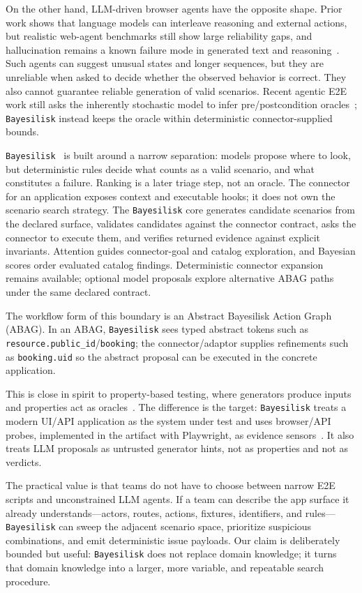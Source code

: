 \documentclass[10pt]{article}
\newcommand{\tool}{\texttt{Bayesilisk}\xspace}
\begin{document}
On the other hand, LLM-driven browser agents have the opposite shape. Prior work
shows that language models can interleave reasoning and external actions, but
realistic web-agent benchmarks still show large reliability gaps, and
hallucination remains a known failure mode in generated text and
reasoning~\cite{react,webarena,ji2023hallucination}. Such agents can suggest
unusual states and longer sequences, but they are unreliable when asked to decide
whether the observed behavior is correct. They also cannot guarantee reliable
generation of valid scenarios.
Recent agentic E2E work still asks the inherently stochastic model to infer
pre/postcondition oracles~\cite{webtestpilot}; \tool instead keeps the oracle
within deterministic connector-supplied bounds.

\tool~\cite{bayesilisk} is built around a narrow separation: models propose where to
look, but deterministic rules decide what counts as a valid scenario, and what
constitutes a failure. Ranking is a later triage step, not an oracle. The
connector for an application exposes context and executable hooks; it does not
own the scenario search strategy. The \tool core generates candidate scenarios
from the declared surface, validates candidates against the connector contract,
asks the connector to execute them, and verifies returned evidence against
explicit invariants. Attention guides connector-goal and catalog exploration, and Bayesian scores
order evaluated catalog findings. Deterministic connector expansion remains
available; optional model proposals explore alternative ABAG paths under the
same declared contract.

The workflow form of this boundary is an Abstract Bayesilisk Action Graph
(ABAG). In an ABAG, \tool sees typed abstract tokens such as
\texttt{resource.public\_id}/\texttt{booking}; the connector/adaptor supplies
refinements such as \texttt{booking.uid} so the abstract proposal can be
executed in the concrete application.

This is close in spirit to property-based testing, where generators produce
inputs and properties act as oracles~\cite{quickcheck}. The difference is the
target: \tool treats a modern UI/API application as the system under test and
uses browser/API probes, implemented in the artifact with Playwright, as
evidence sensors~\cite{playwright}. It also treats LLM proposals as untrusted
generator hints, not as properties and not as verdicts.

The practical value is that teams do not have to choose between narrow E2E
scripts and unconstrained LLM agents. If a team can describe the app surface it
already understands---actors, routes, actions, fixtures, identifiers, and
rules---\tool can sweep the adjacent scenario space, prioritize suspicious
combinations, and emit deterministic issue payloads. Our claim is deliberately
bounded but useful: \tool does not replace domain knowledge; it turns that
domain knowledge into a larger, more variable, and repeatable search procedure.
\end{document}
